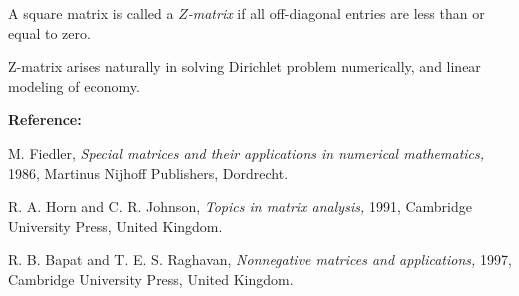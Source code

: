 \documentclass[12pt]{article}
\begin{document}
A square matrix is called a \emph{$Z$-matrix} if all off-diagonal entries are less than or equal to zero.


Z-matrix arises naturally in solving Dirichlet problem
numerically, and linear modeling of economy. 


{\bf Reference:}

M. Fiedler, {\it Special matrices and their applications in
numerical mathematics,} 1986, Martinus Nijhoff Publishers,
Dordrecht.

R. A. Horn and C. R. Johnson, {\it Topics in matrix analysis,}
1991, Cambridge University Press, United Kingdom.

R. B. Bapat and T. E. S. Raghavan, {\it Nonnegative matrices and
applications,} 1997, Cambridge University Press, United Kingdom.
\end{document}
